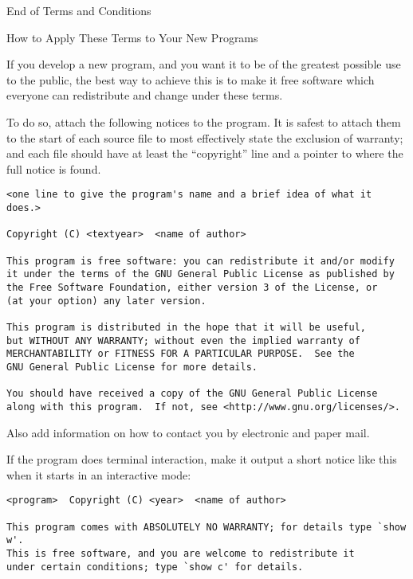 \documentclass[11pt,a4paper]{refrep}
\begin{document}
\begin{fullpage}
\begin{enumerate}
\begin{center}
{\Large\sc End of Terms and Conditions}

\bigskip
How to Apply These Terms to Your New Programs
\end{center}

If you develop a new program, and you want it to be of the greatest
possible use to the public, the best way to achieve this is to make it
free software which everyone can redistribute and change under these terms.

To do so, attach the following notices to the program.  It is safest
to attach them to the start of each source file to most effectively
state the exclusion of warranty; and each file should have at least
the ``copyright'' line and a pointer to where the full notice is found.

{\footnotesize
\begin{verbatim}
<one line to give the program's name and a brief idea of what it does.>

Copyright (C) <textyear>  <name of author>

This program is free software: you can redistribute it and/or modify
it under the terms of the GNU General Public License as published by
the Free Software Foundation, either version 3 of the License, or
(at your option) any later version.

This program is distributed in the hope that it will be useful,
but WITHOUT ANY WARRANTY; without even the implied warranty of
MERCHANTABILITY or FITNESS FOR A PARTICULAR PURPOSE.  See the
GNU General Public License for more details.

You should have received a copy of the GNU General Public License
along with this program.  If not, see <http://www.gnu.org/licenses/>.
\end{verbatim}
}

Also add information on how to contact you by electronic and paper mail.

If the program does terminal interaction, make it output a short
notice like this when it starts in an interactive mode:

{\footnotesize
\begin{verbatim}
<program>  Copyright (C) <year>  <name of author>

This program comes with ABSOLUTELY NO WARRANTY; for details type `show w'.
This is free software, and you are welcome to redistribute it
under certain conditions; type `show c' for details.
\end{verbatim}
}


\end{enumerate}
\end{fullpage}
\end{document}
